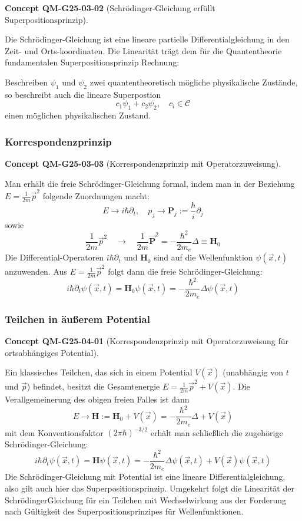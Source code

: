 \documentclass[10pt, letterpaper]{article}
\newcommand{\CustomHeading}[3]{%
  \par\medskip\noindent%
  \textbf{#1 #2} \textnormal{(#3)}.\enskip%
}
\newenvironment{CONC}[2]{\begin{unitbox}\CustomHeading{Concept}{#1}{#2}}{\end{unitbox}}
\begin{document}
\begin{CONC}{QM-G25-03-02}{Schrödinger-Gleichung erfüllt Superpositionsprinzip}
Die Schrödinger-Gleichung ist eine lineare partielle Differentialgleichung in den Zeit- und Orts-koordinaten. Die Linearität trägt dem für die Quantentheorie fundamentalen Superpositionsprinzip Rechnung:

Beschreiben $\psi_{1}$ und $\psi_{2}$ zwei quantentheoretisch mögliche physikalische Zustände, so beschreibt auch die lineare Superpostion
$$
c_{1} \psi_{1}+c_{2} \psi_{2}, \quad c_{i} \in \mathcal{C}
$$
einen möglichen physikalischen Zustand.
\end{CONC}


\subsubsection*{Korrespondenzprinzip}


\begin{CONC}{QM-G25-03-03}{Korrespondenzprinzip mit Operatorzuweisung}
Man erhält die freie Schrödinger-Gleichung formal, indem man in der Beziehung $E=\frac{1}{2 m} \vec{p}^{2}$ folgende Zuordnungen macht:
$$
E \rightarrow i \hbar \partial_{t}, \quad p_{j} \rightarrow \mathbf{P}_{j}:=\frac{\hbar}{i} \partial_{j}
$$
sowie
$$
\frac{1}{2 m} \vec{p}^{2} \quad \rightarrow \quad \frac{1}{2 m} \overrightarrow{\mathbf{P}}^{2}=-\frac{\hbar^{2}}{2 m_{e}} \Delta \equiv \mathbf{H}_{0}
$$
Die Differential-Operatoren $i \hbar \partial_{t}$ und $\mathbf{H}_{0}$ sind auf die Wellenfunktion $\psi(\vec{x}, t)$ anzuwenden. Aus $E=\frac{1}{2 m} \vec{p}^{2}$ folgt dann die freie Schrödinger-Gleichung:
$$
i \hbar \partial_{t} \psi(\vec{x}, t)=\mathbf{H}_{0} \psi(\vec{x}, t)=-\frac{\hbar^{2}}{2 m_{e}} \Delta \psi(\vec{x}, t)
$$
\end{CONC}



\subsubsection{Teilchen in äußerem Potential}



\begin{CONC}{QM-G25-04-01}{Korrespondenzprinzip mit Operatorzuweisung für ortsabhängiges Potential}
Ein klassisches Teilchen, das sich in einem Potential $V(\vec{x})$ (unabhängig von $t$ und $\vec{p}$) befindet, besitzt die Gesamtenergie $E=\frac{1}{2 m} \vec{p}^{2}+V(\vec{x})$. Die Verallgemeinerung des obigen freien Falles ist dann
$$
E \rightarrow \mathbf{H}:=\mathbf{H}_{0}+V(\vec{x})=-\frac{\hbar^{2}}{2 m_{e}} \Delta+V(\vec{x})
$$
mit dem Konventionsfaktor $(2 \pi \hbar)^{-3/2}$ erhält man schließlich die zugehörige Schrödinger-Gleichung:
$$
i \hbar \partial_{t} \psi(\vec{x}, t)=\mathbf{H} \psi(\vec{x}, t)=-\frac{\hbar^{2}}{2 m_{e}} \Delta \psi(\vec{x}, t)+V(\vec{x}) \psi(\vec{x}, t)
$$
Die Schrödinger-Gleichung mit Potential ist eine lineare Differentialgleichung, also gilt auch hier das Superpositionsprinzip. Umgekehrt folgt die Linearität der SchrödingerGleichung für ein Teilchen mit Wechselwirkung aus der Forderung nach Gültigkeit des Superpositionsprinzipes für Wellenfunktionen.
\end{CONC}
\end{document}
